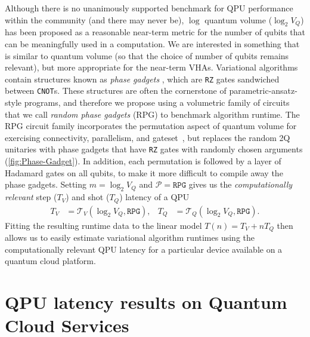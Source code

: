 \documentclass[12pt]{iopart}
\begin{document}
Although there is no unanimously supported benchmark for QPU performance within the community (and there may never be), $\log$ quantum volume \cite{CrossQuantumVolume, MollVariational} ($\log_{2}{V_Q}$) has been proposed as a reasonable near-term metric for the number of qubits that can be meaningfully used in a computation. We are interested in something that is similar to quantum volume (so that the choice of number of qubits remains relevant), but more appropriate for the near-term VHAs. Variational algorithms contain structures known as \textit{phase gadgets} \cite{CowtanPhaseGadgets}, which are \texttt{RZ} gates sandwiched between \texttt{CNOT}s. These structures are often the cornerstone of parametric-ansatz-style programs, and therefore we propose using a volumetric family of circuits~\cite{RobinVolumetrics} that we call \textit{random phase gadgets} (RPG) to benchmark algorithm runtime. The RPG circuit family incorporates the permutation aspect of quantum volume for exercising connectivity, parallelism, and gateset~\cite{PetersonPolytopes}, but replaces the random 2Q unitaries with phase gadgets that have \texttt{RZ} gates with randomly chosen arguments (\cref{fig:Phase-Gadget}). In addition, each permutation is followed by a layer of Hadamard gates on all qubits, to make it more difficult to compile away the phase gadgets. Setting $m = \log_{2}{V_Q}$ and $\mathcal{P} = \texttt{RPG}$ gives us the \textit{computationally relevant} step ($T_V$) and shot ($T_Q$) latency of a QPU
\begin{align}
T_{V} &= \mathcal{T}_{V}(\log_{2}{V_Q}, \texttt{RPG}), & T_{Q} &= \mathcal{T}_{Q}(\log_{2}{V_Q}, \texttt{RPG}).
\end{align}
Fitting the resulting runtime data to the linear model $T(n) = T_{V} + n T_{Q}$ then allows us to easily estimate variational algorithm runtimes using the computationally relevant QPU latency for a particular device available on a quantum cloud platform.

\section{QPU latency results on Quantum Cloud Services}
\end{document}
